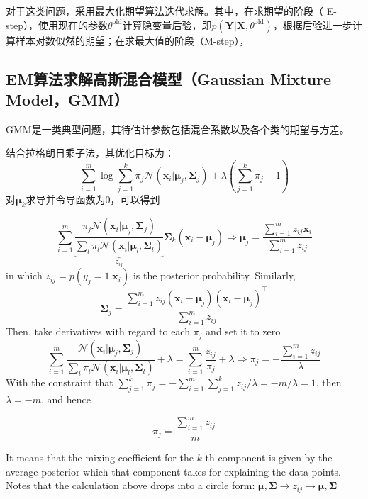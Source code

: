 \documentclass{article}
\begin{document}
	对于这类问题，采用最大化期望算法迭代求解。其中，在求期望的阶段（ E-step），使用现在的参数$\theta^{\mathrm{old}}$计算隐变量后验，即$p(\bm{Y}|\bm{X}, \theta^{\mathrm{old}})$，根据后验进一步计算样本对数似然的期望；在求最大值的阶段（M-step），
	
	\subsection{EM算法求解高斯混合模型（Gaussian Mixture Model，GMM）}
	
	GMM是一类典型问题，其待估计参数包括混合系数以及各个类的期望与方差。
	
	\vspace{1mm}
	\begin{scriptsize}
	\begin{spacing}{1.2}
	{\sffamily
	结合拉格朗日乘子法，其优化目标为：
	\begin{equation}
	\sum_{i=1}^m \log \sum_{j=1}^k \pi_j \mathcal{N} (\bm{x}_i|\bm{\mu}_j,\bm{\Sigma}_j) + \lambda \left(\sum_{j=1}^k \pi_j - 1\right)
	\end{equation}
	对$\bm{\mu}_k$求导并令导函数为0，可以得到
	
	\begin{equation}
	\label{eq:GMM_mu}
	\sum_{i=1}^m \underbrace{\frac{\pi_j  \mathcal{N} (\bm{x}_i|\bm{\mu}_j,\bm{\Sigma}_j)}{\sum_l \pi_l \mathcal{N} (\bm{x}_i|\bm{\mu}_l,\bm{\Sigma}_l)}}_{z_{ij}} \bm{\Sigma}_k (\bm{x}_i - \bm{\mu}_j) \Longrightarrow \bm{\mu}_j=\frac{\sum_{i=1}^m z_{ij} \bm{x}_i}{\sum_{i=1}^m z_{ij}}
	\end{equation}
in which $z_{ij}=p(y_j=1|\bm{x}_i)$ is the posterior probability. Similarly,
	\begin{equation}
	\label{eq:GMM_sigma}
	\bm{\Sigma}_j=\frac{\sum_{i=1}^m z_{ij} (\bm{x}_i-\bm{\mu}_j)(\bm{x}_i-\bm{\mu}_j)^\top}{\sum_{i=1}^m z_{ij}}
	\end{equation}
	Then, take derivatives with regard to each $\pi_j$ and set it to zero
	\begin{equation*}
	\sum_{i=1}^m \frac{\mathcal{N} (\bm{x}_i|\bm{\mu}_j,\bm{\Sigma}_j) }{\sum_l \pi_l \mathcal{N} (\bm{x}_i|\bm{\mu}_l,\bm{\Sigma}_l)} + \lambda = \sum_{i=1}^m \frac{z_{ij}}{\pi_j} + \lambda \Longrightarrow \pi_j=-\frac{\sum_{i=1}^m z_{ij}}{\lambda}
	\end{equation*}
With the constraint that $\sum_{j=1}^k\pi_j=-\sum_{i=1}^m\sum_{j=1}^k z_{ij}/\lambda = -m/\lambda=1$, then $\lambda=-m$, and hence

	\begin{equation}
	\label{eq:GMM_pi}
	\pi_j=\frac{\sum_{i=1}^m z_{ij}}{m}
	\end{equation}
	
	It means that the mixing coefficient for the $k$-th component is given by the average posterior which that component takes for explaining the data points. Notes that the calculation above drops into a circle form: $\bm{\mu}, \bm{\Sigma} \rightarrow z_{ij} \rightarrow \bm{\mu}, \bm{\Sigma}$
	}
	\end{spacing}
	\end{scriptsize}
	\vspace{-2mm}
	
\end{document}
